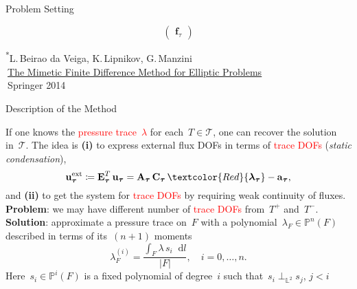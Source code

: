 \documentclass[final, svgnames]{beamer}
\newlength{\onecolwid}
\newcommand{\svginputw}[2][\linewidth]{\def\svgwidth{#1}} %
\newcommand{\vect}[1]{\boldsymbol{\mathbf{#1}}}
\newcommand{\bmesh}{{\vect{\mathcal T}}}
\newcommand{\mmesh}{{\vect{\mathcal \tau}}}
\newcommand{\mfaces}[1][]{{\vect{\mathcal f}_{\text{#1}}}}
\newcommand{\LTwo}{{\mathbb L^2}}
\newcommand{\PnSpace}[2]{{\mathbb P^{#1}\left({#2}\right)}}
\newcommand*\diff{\mathop{}\!\mathrm{d}}
\begin{document}
\begin{frame}[t]
\begin{columns}[t]
\begin{column}{\onecolwid}
\begin{block}{Problem Setting}
\begin{figure}
\begin{subfigure}{.6\linewidth}
\begin{equation*}
\begin{pmatrix}
				\vect f_\mmesh        
				\end{pmatrix}
				\end{equation*}		
			\end{subfigure}%
		\end{figure}
		\setul{1pt}{.4pt} %
		\tiny{
			\textsuperscript{*}L.\,Beirao da Veiga, K.\,Lipnikov, G.\,Manzini\\
			$\:$\href{https://www.springer.com/us/book/9783319026626}{\ul{The Mimetic Finite Difference Method for Elliptic Problems}}\\
			$\:$Springer 2014
		}
\end{block}

\begin{block}{Description of the Method}

		If one knows the \textcolor{Red}{pressure trace~$\lambda$} for each~$T \in \bmesh$, one can recover the solution in~$\bmesh$. The idea is \textbf{(i)} to express external flux DOFs in terms of \textcolor{Red}{trace DOFs} (\textit{static condensation}),
$$
\vect u^\text{ext}_\mmesh \coloneqq \vect E_\mmesh^T\,\vect u_\mmesh = \vect A_\mmesh\,\vect C_\mmesh\,\textcolor{Red}{\vect \lambda_\mmesh} - \vect a_\mmesh,
$$
and \textbf{(ii)} to get the system for \textcolor{Red}{trace DOFs} by requiring weak continuity of fluxes. \textbf{Problem}: we may have different number of \textcolor{Red}{trace DOFs} from~$T^+$ and~$T^-$.	
		\textbf{Solution}: approximate a pressure trace on~$F$ with a polynomial~$\lambda_F \in \PnSpace{n}{F}$ described in terms of its~$(n+1)$ moments
\begin{equation*}
\lambda^{(i)}_F=\frac{\int_F  \lambda\,s_i \diff l}{|F|}, \quad i = 0, \dots, n.
\end{equation*}
Here~$s_i \in \PnSpace{i}{F}$ is a fixed polynomial of degree~$i$ such that~$s_i \perp_\LTwo s_j$, $j < i$
\end{block}



\end{column} %


\end{columns}
\end{frame}
\end{document}
